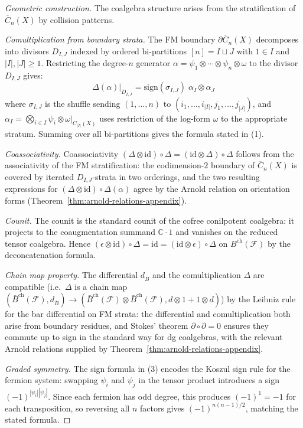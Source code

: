 \begin{proof}[Geometric construction]
The coalgebra structure arises from the stratification of $\overline{C}_n(X)$ by collision patterns.

\noindent\emph{Comultiplication from boundary strata.}
The FM boundary $\partial\overline{C}_n(X)$ decomposes into divisors $D_{I,J}$ indexed by ordered bi-partitions $[n] = I \sqcup J$ with $1 \in I$ and $|I|, |J| \geq 1$. Restricting the degree-$n$ generator $\alpha = \psi_1 \otimes \cdots \otimes \psi_n \otimes \omega$ to the divisor $D_{I,J}$ gives:
\[
\Delta(\alpha)|_{D_{I,J}} = \mathrm{sign}(\sigma_{I,J})\;\alpha_I \otimes \alpha_J
\]
where $\sigma_{I,J}$ is the shuffle sending $(1,\ldots,n)$ to $(i_1,\ldots,i_{|I|},j_1,\ldots,j_{|J|})$, and $\alpha_I = \bigotimes_{i\in I}\psi_i \otimes \omega|_{C_{|I|}(X)}$ uses restriction of the log-form $\omega$ to the appropriate stratum. Summing over all bi-partitions gives the formula stated in (1).

\noindent\emph{Coassociativity.}
Coassociativity $(\Delta \otimes \mathrm{id}) \circ \Delta
= (\mathrm{id} \otimes \Delta) \circ \Delta$ follows from the
associativity of the FM stratification: the codimension-$2$ boundary
of $\overline{C}_n(X)$ is covered by iterated $D_{I,J}$-strata in two
orderings, and the two resulting expressions for
$(\Delta \otimes \mathrm{id}) \circ \Delta(\alpha)$ agree by the
Arnold relation on orientation forms
(Theorem~\ref{thm:arnold-relations-appendix}).

\noindent\emph{Counit.}
The counit is the standard counit of the cofree conilpotent coalgebra:
it projects to the coaugmentation summand $\mathbb{C}\cdot 1$ and
vanishes on the reduced tensor coalgebra. Hence
$(\epsilon\otimes\mathrm{id})\circ\Delta
=\mathrm{id}=(\mathrm{id}\otimes\epsilon)\circ\Delta$ on
$B^{\mathrm{ch}}(\mathcal{F})$ by the deconcatenation formula.

\noindent\emph{Chain map property.}
The differential $d_{\bar{B}}$ and the comultiplication $\Delta$ are
compatible (i.e.\ $\Delta$ is a chain map
$(\bar{B}^{\mathrm{ch}}(\mathcal{F}), d_{\bar{B}}) \to
(\bar{B}^{\mathrm{ch}}(\mathcal{F}) \otimes
\bar{B}^{\mathrm{ch}}(\mathcal{F}), d \otimes 1 + 1 \otimes d)$) by
the Leibniz rule for the bar differential on FM strata: the
differential and comultiplication both arise from boundary residues,
and Stokes' theorem $\partial \circ \partial = 0$ ensures they commute
up to sign in the standard way for dg coalgebras, with the relevant
Arnold relations supplied by
Theorem~\ref{thm:arnold-relations-appendix}.

\noindent\emph{Graded symmetry.}
The sign formula in (3) encodes the Koszul sign rule for the fermion system: swapping $\psi_i$ and $\psi_j$ in the tensor product introduces a sign $(-1)^{|\psi_i||\psi_j|}$. Since each fermion has odd degree, this produces $(-1)^1 = -1$ for each transposition, so reversing all $n$ factors gives $(-1)^{n(n-1)/2}$, matching the stated formula.
\end{proof}


